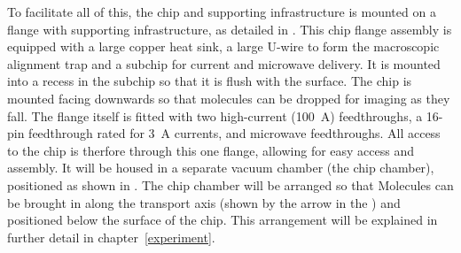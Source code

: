 To facilitate all of this, the chip and supporting infrastructure is mounted on
a flange with supporting infrastructure, as detailed in
. This chip flange assembly is equipped with
a large copper heat sink, a large U-wire to form the macroscopic alignment trap
and a subchip for current and microwave delivery. It is mounted into a recess
in the subchip so that it is flush with the surface. The chip is mounted facing
downwards so that molecules can be dropped for imaging as they fall. The flange
itself is fitted with two high-current (\SI{100}{\ampere}) feedthroughs, a
16-pin feedthrough rated for \SI{3}{\ampere} currents, and microwave
feedthroughs. All access to the chip is therfore through this one flange,
allowing for easy access and assembly.  It will be housed in a separate vacuum
chamber (the chip chamber), positioned as shown in
. The chip chamber will be arranged so that
Molecules can be brought in along the transport axis (shown by the arrow in the
) and positioned below the surface of
the chip.  This arrangement will be explained in further detail in
chapter~\ref{experiment}.
